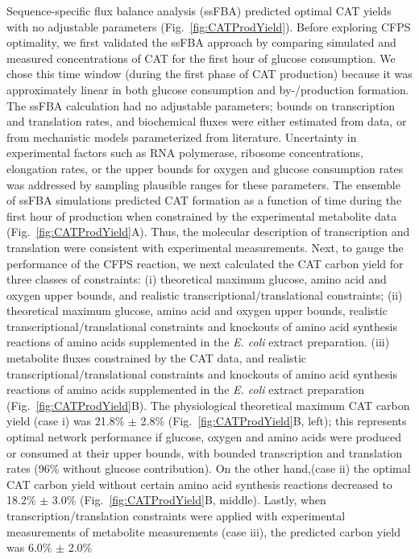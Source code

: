 \documentclass[12pt]{article}
\begin{document}
Sequence-specific flux balance analysis (ssFBA) predicted optimal CAT yields with no adjustable parameters (Fig.~\ref{fig:CATProdYield}).
Before exploring CFPS optimality, we first validated the ssFBA approach by comparing simulated and measured concentrations of CAT for the first hour of glucose consumption.
We chose this time window (during the first phase of CAT production) because it was approximately linear in both glucose consumption and by-/production formation.
The ssFBA calculation had no adjustable parameters; bounds on transcription and translation rates, and biochemical fluxes were either estimated from data, or
from mechanistic models parameterized from literature.
Uncertainty in experimental factors such as RNA polymerase, ribosome concentrations, elongation rates, or the upper bounds for oxygen and glucose consumption rates was addressed
by sampling plausible ranges for these parameters.
The ensemble of ssFBA simulations predicted CAT formation as a function of time during the first hour of production when constrained by the experimental metabolite data (Fig.~\ref{fig:CATProdYield}A).
Thus, the molecular description of transcription and translation were consistent with experimental measurements.
Next, to gauge the performance of the CFPS reaction, we next calculated the CAT carbon yield for three classes of constraints:
(i) theoretical maximum glucose, amino acid and oxygen upper bounds, and realistic transcriptional/translational constraints;
(ii) theoretical maximum glucose, amino acid and oxygen upper bounds, realistic transcriptional/translational constraints and knockouts of amino acid synthesis reactions of amino acids supplemented in the \textit{E. coli} extract preparation.  
(iii) metabolite fluxes constrained by the CAT data, and realistic transcriptional/translational constraints and knockouts of amino acid synthesis reactions of amino acids supplemented in the \textit{E. coli} extract preparation (Fig.~\ref{fig:CATProdYield}B).
The physiological theoretical maximum CAT carbon yield (case i) was 21.8\% $\pm$ 2.8\% (Fig.~\ref{fig:CATProdYield}B, left); this represents optimal network performance if glucose, oxygen and amino acids were produced or consumed at their upper bounds, with bounded transcription and translation rates (96\% without glucose contribution).
On the other hand,(case ii) the optimal CAT carbon yield without certain amino acid synthesis reactions decreased to 18.2\% $\pm$ 3.0\% (Fig.~\ref{fig:CATProdYield}B, middle).
Lastly, when transcription/translation constraints were applied with experimental measurements of metabolite measurements (case iii), the predicted carbon yield was 6.0\% $\pm$ 2.0\%
\end{document}
